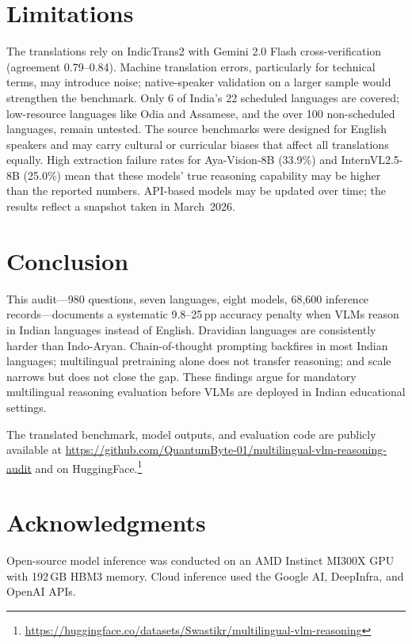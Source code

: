 \documentclass[11pt,a4paper]{article}
\newcommand{\pp}{\,\text{pp}}
\begin{document}
\section{Limitations}
\label{sec:limits}

The translations rely on IndicTrans2 with Gemini 2.0 Flash cross-verification (agreement 0.79--0.84).
Machine translation errors, particularly for technical terms, may introduce noise; native-speaker validation on a larger sample would strengthen the benchmark.
Only 6 of India's 22 scheduled languages are covered; low-resource languages like Odia and Assamese, and the over 100 non-scheduled languages, remain untested.
The source benchmarks were designed for English speakers and may carry cultural or curricular biases that affect all translations equally.
High extraction failure rates for Aya-Vision-8B (33.9\%) and InternVL2.5-8B (25.0\%) mean that these models' true reasoning capability may be higher than the reported numbers.
API-based models may be updated over time; the results reflect a snapshot taken in March~2026.


\section{Conclusion}
\label{sec:conclusion}

This audit---980 questions, seven languages, eight models, 68{,}600 inference records---documents a systematic 9.8--25$\pp$ accuracy penalty when VLMs reason in Indian languages instead of English.
Dravidian languages are consistently harder than Indo-Aryan.
Chain-of-thought prompting backfires in most Indian languages; multilingual pretraining alone does not transfer reasoning; and scale narrows but does not close the gap.
These findings argue for mandatory multilingual reasoning evaluation before VLMs are deployed in Indian educational settings.

The translated benchmark, model outputs, and evaluation code are publicly available at \url{https://github.com/QuantumByte-01/multilingual-vlm-reasoning-audit} and on HuggingFace.\footnote{\url{https://huggingface.co/datasets/Swastikr/multilingual-vlm-reasoning}}


\section*{Acknowledgments}

Open-source model inference was conducted on an AMD Instinct MI300X GPU with 192\,GB HBM3 memory.
Cloud inference used the Google AI, DeepInfra, and OpenAI APIs.



\end{document}
